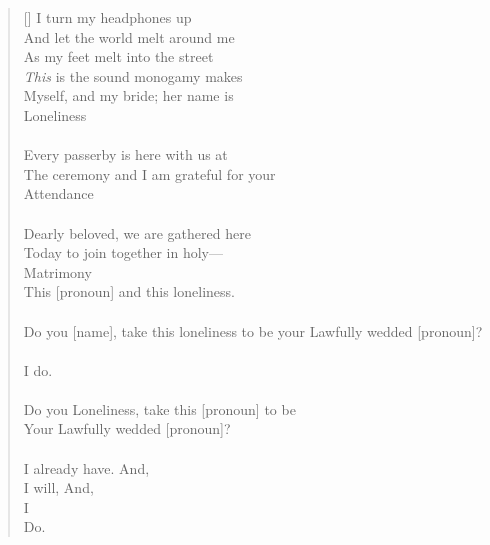 \documentclass{article}
\begin{document}
\settowidth{\versewidth}{Than Tycho Brahe, or Erra Pater:}
\begin{verse}[\versewidth]
I turn my headphones up \\
And let the world melt around me \\
As my feet melt into the street \\
\textit{This} is the sound monogamy makes \\
Myself, and my bride; her name is \\
Loneliness \\
\\
Every passerby is here with us at \\
The ceremony and I am grateful for your \\
Attendance \\
\\
Dearly beloved, we are gathered here \\
Today to join together in holy— \\
Matrimony \\
This [pronoun] and this loneliness. \\
\\
Do you [name], take this loneliness to be your Lawfully wedded [pronoun]? \\
\\
I do. \\ 
\\
Do you Loneliness, take this [pronoun] to be \\
Your Lawfully wedded [pronoun]? \\
\\
I already have. And, \\
I will, And, \\
I \\
Do. \\
\end{verse}
\end{document}
